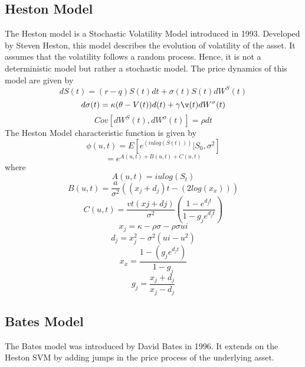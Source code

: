 \documentclass{article}
\begin{document}
\subsection{Heston Model}
The Heston model is a Stochastic Volatility Model introduced in 1993. Developed by Steven Heston, this model describes the evolution of volatility of the asset. It assumes that the volatility follows a random process. Hence, it is not a deterministic model but rather a stochastic model.
The price dynamics of this model are given by
\begin{equation}
dS(t) = (r- q)S(t)dt + \sigma(t)S(t)dW^S(t)
\end{equation}
\begin{equation}
d\sigma(t) = \kappa(\theta-V(t))d(t) + \gamma\v(t)dW^\sigma(t)
\end{equation}
\begin{equation}
Cov[dW^S(t), dW^\sigma(t)] = \rho dt
\end{equation}
The Heston Model characteristic function is given by
\begin{equation}
    \phi(u,t) = E[e^{(iulog(S(t)))}|S_{0}, \sigma^2]
\end{equation}
\begin{equation}
    = e^{A(u,t)+B(u,t)+C(u,t)}
\end{equation}
where
\begin{equation}
    A(u,t) = iulog(S_t)
\end{equation}
\begin{equation}
    B(u,t) = \frac{a}{\sigma^2}((x_j+d_j)t - (2log(x_x)) )
\end{equation}
\begin{equation}
    C(u,t) = \frac{vt(xj+dj)}{\sigma^2} (\frac{1-e^{d_j t}}{ 1-g_je^{d_j t}})
\end{equation}
\begin{equation}
    x_j = \kappa-\rho\sigma-\rho\sigma ui
\end{equation}
\begin{equation}
    d_j = x_{j}^2 - \sigma^2(ui - u^2)
\end{equation}
\begin{equation}
    x_x = \frac{ 1-(g_j e^{d_j t})}{ 1-g_j}
\end{equation}
\begin{equation}
    g_j = \frac{x_j + d_j}{x_j - d_j}
\end{equation}
\subsection{Bates Model}
The Bates model was introduced by David Bates in 1996. It extends on the Heston SVM by  adding jumps in the price process of the underlying asset. 
\end{document}
